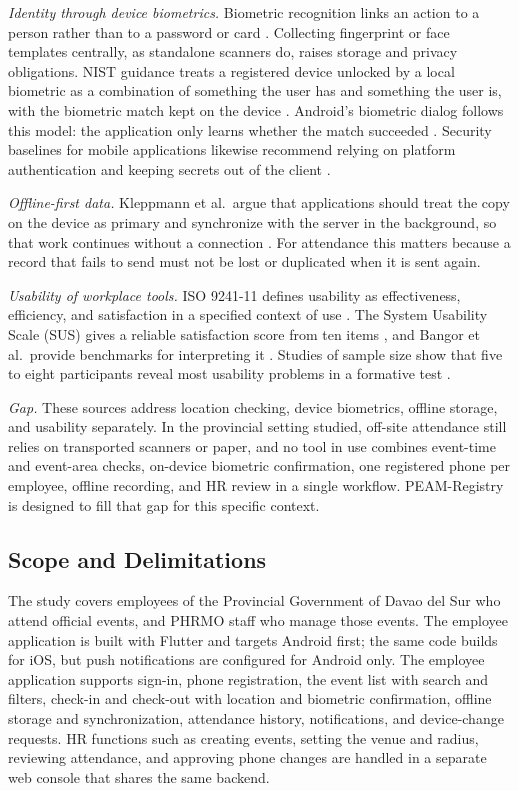 \documentclass[conference]{IEEEtran}
\begin{document}
\textit{Identity through device biometrics.}
Biometric recognition links an action to a person rather than to a
password or card \cite{jain2004biometric}. Collecting fingerprint or face
templates centrally, as standalone scanners do, raises storage and
privacy obligations. NIST guidance treats a registered device unlocked by
a local biometric as a combination of something the user has and
something the user is, with the biometric match kept on the device
\cite{nist80063b}. Android's biometric dialog follows this model: the
application only learns whether the match succeeded
\cite{androidbiometric}. Security baselines for mobile applications
likewise recommend relying on platform authentication and keeping
secrets out of the client \cite{owaspmasvs}.

\textit{Offline-first data.}
Kleppmann et al.\ argue that applications should treat the copy on the
device as primary and synchronize with the server in the background, so
that work continues without a connection \cite{kleppmann2019localfirst}.
For attendance this matters because a record that fails to send must not
be lost or duplicated when it is sent again.

\textit{Usability of workplace tools.}
ISO 9241-11 defines usability as effectiveness, efficiency, and
satisfaction in a specified context of use \cite{iso9241_11}. The System
Usability Scale (SUS) gives a reliable satisfaction score from ten items
\cite{brooke1996sus}, and Bangor et al.\ provide benchmarks for
interpreting it \cite{bangor2008sus}. Studies of sample size show that
five to eight participants reveal most usability problems in a
formative test \cite{virzi1992subjects,nielsen1993model}.

\textit{Gap.}
These sources address location checking, device biometrics, offline
storage, and usability separately. In the provincial setting studied,
off-site attendance still relies on transported scanners or paper, and
no tool in use combines event-time and event-area checks, on-device
biometric confirmation, one registered phone per employee, offline
recording, and HR review in a single workflow. PEAM-Registry is designed
to fill that gap for this specific context.

\subsection{Scope and Delimitations}

The study covers employees of the Provincial Government of Davao del Sur
who attend official events, and PHRMO staff who manage those events. The
employee application is built with Flutter and targets Android first;
the same code builds for iOS, but push notifications are configured for
Android only. The employee application supports sign-in, phone
registration, the event list with search and filters, check-in and
check-out with location and biometric confirmation, offline storage and
synchronization, attendance history, notifications, and device-change
requests. HR functions such as creating events, setting the venue and
radius, reviewing attendance, and approving phone changes are handled in
a separate web console that shares the same backend.
\end{document}
